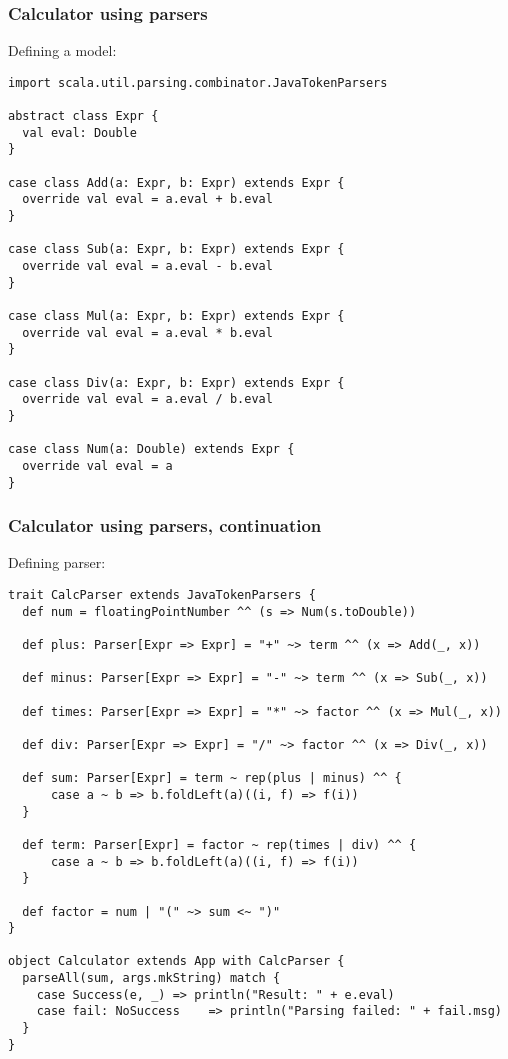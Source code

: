 \documentclass[t]{beamer}
\begin{document}
\begin{frame}[fragile]
\frametitle{Calculator using parsers}
Defining a model:
\begin{lstlisting}[name=calc]
import scala.util.parsing.combinator.JavaTokenParsers

abstract class Expr {
  val eval: Double
}

case class Add(a: Expr, b: Expr) extends Expr {
  override val eval = a.eval + b.eval
}

case class Sub(a: Expr, b: Expr) extends Expr {
  override val eval = a.eval - b.eval
}

case class Mul(a: Expr, b: Expr) extends Expr {
  override val eval = a.eval * b.eval
}

case class Div(a: Expr, b: Expr) extends Expr {
  override val eval = a.eval / b.eval
}

case class Num(a: Double) extends Expr {
  override val eval = a
}
\end{lstlisting}
\end{frame}

\begin{frame}[fragile]
\frametitle{Calculator using parsers, continuation}
Defining parser:
\begin{lstlisting}[name=calc]
trait CalcParser extends JavaTokenParsers {
  def num = floatingPointNumber ^^ (s => Num(s.toDouble))

  def plus: Parser[Expr => Expr] = "+" ~> term ^^ (x => Add(_, x))

  def minus: Parser[Expr => Expr] = "-" ~> term ^^ (x => Sub(_, x))

  def times: Parser[Expr => Expr] = "*" ~> factor ^^ (x => Mul(_, x))

  def div: Parser[Expr => Expr] = "/" ~> factor ^^ (x => Div(_, x))

  def sum: Parser[Expr] = term ~ rep(plus | minus) ^^ {
      case a ~ b => b.foldLeft(a)((i, f) => f(i))
  }

  def term: Parser[Expr] = factor ~ rep(times | div) ^^ {
      case a ~ b => b.foldLeft(a)((i, f) => f(i))
  }

  def factor = num | "(" ~> sum <~ ")"
}

object Calculator extends App with CalcParser {
  parseAll(sum, args.mkString) match {
    case Success(e, _) => println("Result: " + e.eval)
    case fail: NoSuccess    => println("Parsing failed: " + fail.msg)
  }
}
\end{lstlisting}
\end{frame}
\end{document}
